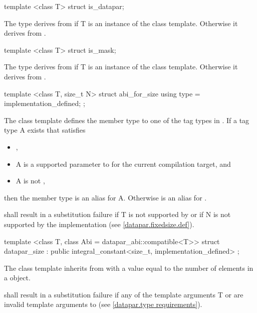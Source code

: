 \begin{itemdecl}
template <class T> struct is_datapar;
\end{itemdecl}
\begin{itemdescr}
  \pnum The  type derives from  if \type T is an instance of the \datapar class template.
  Otherwise it derives from .
\end{itemdescr}

\begin{itemdecl}
template <class T> struct is_mask;
\end{itemdecl}
\begin{itemdescr}
  \pnum The  type derives from  if \type T is an instance of the \mask class template.
  Otherwise it derives from .
\end{itemdescr}

\begin{itemdecl}
template <class T, size_t N> struct abi_for_size { using type = implementation_defined; };
\end{itemdecl}
\begin{itemdescr}
  \pnum
  The  class template defines the member type  to one of the tag types in .
  If a tag type \type A exists that satisfies
  \begin{itemize}
    \item {},
    \item \type A is a supported  parameter to \datapar[<T, Abi>] for the current compilation target, and
    \item \type A is not \fixedsizeN,
  \end{itemize} then the member type  is an alias for \type A.
  Otherwise  is an alias for \fixedsizeN.

  \pnum {} shall result in a substitution failure if \type T is not supported by \datapar or if \code N is not supported by the implementation (see \ref{datapar.fixedsize.def}).
\end{itemdescr}

\begin{itemdecl}
template <class T, class Abi = datapar_abi::compatible<T>>
struct datapar_size : public integral_constant<size_t, implementation_defined> {};
\end{itemdecl}
\begin{itemdescr}
  \pnum\label{datapar_size}%
  The  class template inherits from  with a value equal to the number of elements in a \datapar{} object.

  \pnum {} shall result in a substitution failure if any of the template arguments \type T or  are invalid template arguments to \datapar (see \ref{datapar.type requirements}).
\end{itemdescr}

